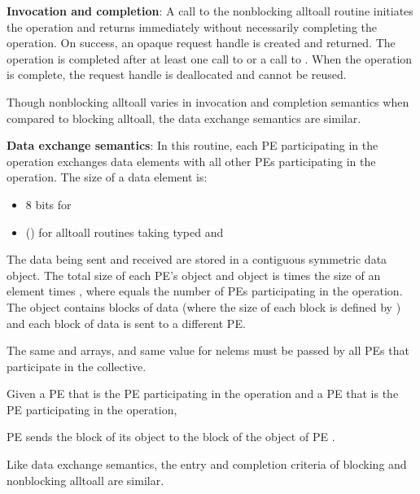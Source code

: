 \begin{apidefinition}
{    {\bf Invocation and completion}: A call to the nonblocking alltoall routine initiates the operation and returns
    immediately without necessarily completing the operation. On success,
    an opaque request handle is created and returned. The
    operation is completed after at least one call to  or
    a call to . When the operation is complete, the request handle
    is deallocated and cannot be reused.

    Though nonblocking alltoall varies in invocation and completion semantics
    when compared to blocking alltoall, the data exchange semantics are similar.

    {\bf Data exchange semantics}:
    In this routine, each \ac{PE}
    participating in the operation exchanges  data elements
    with all other \acp{PE} participating in the operation.
    The size of a data element is:
    \begin{itemize}
    \item 8 bits for 
    \item {}(\TYPE{}) for alltoall routines taking typed  and 
    \end{itemize}

    The data being sent and received are
    stored in a contiguous symmetric data object. The total size of each \ac{PE}'s
     object and  object is  times the size of
    an element
    times , where  equals the number of \acp{PE} participating
    in the operation.
    The  object contains  blocks of data
    (where the size of each block is defined by ) and each block of data
    is sent to a different \ac{PE}.

    The same \dest{} and \source{}
    arrays, and same value for nelems
    must be passed by all \acp{PE} that participate in the collective.

    Given a \ac{PE}  that is the \kth \ac{PE}
    participating in the operation and a \ac{PE}
     that is the \lth \ac{PE}
    participating in the operation,

    \ac{PE}  sends the \lth block of its  object to
    the \kth block of
    the  object of \ac{PE} .

    
    Like data exchange semantics, the entry and completion
    criteria of blocking and nonblocking alltoall are similar.

}
\end{apidefinition}
